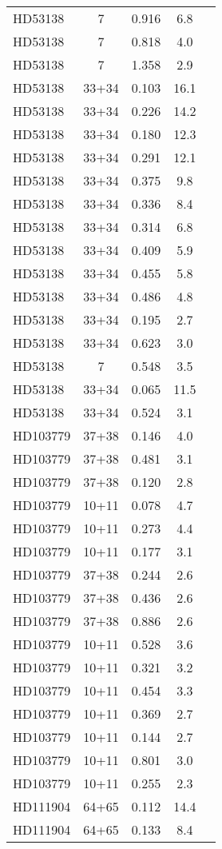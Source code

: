 \begin{table*}
\begin{tabular}{l c c c c}
HD53138 & 7 & 0.916 & 6.8\\ 
HD53138 & 7 & 0.818 & 4.0\\ 
HD53138 & 7 & 1.358 & 2.9\\ 
HD53138 & 33+34 & 0.103 & 16.1\\ 
HD53138 & 33+34 & 0.226 & 14.2\\ 
HD53138 & 33+34 & 0.180 & 12.3\\ 
HD53138 & 33+34 & 0.291 & 12.1\\ 
HD53138 & 33+34 & 0.375 & 9.8\\ 
HD53138 & 33+34 & 0.336 & 8.4\\ 
HD53138 & 33+34 & 0.314 & 6.8\\ 
HD53138 & 33+34 & 0.409 & 5.9\\ 
HD53138 & 33+34 & 0.455 & 5.8\\ 
HD53138 & 33+34 & 0.486 & 4.8\\ 
HD53138 & 33+34 & 0.195 & 2.7\\ 
HD53138 & 33+34 & 0.623 & 3.0\\ 
HD53138 & 7 & 0.548 & 3.5\\ 
HD53138 & 33+34 & 0.065 & 11.5\\ 
HD53138 & 33+34 & 0.524 & 3.1\\ 
\hline
HD103779 & 37+38 & 0.146 & 4.0\\ 
HD103779 & 37+38 & 0.481 & 3.1\\ 
HD103779 & 37+38 & 0.120 & 2.8\\ 
HD103779 & 10+11 & 0.078 & 4.7\\ 
HD103779 & 10+11 & 0.273 & 4.4\\ 
HD103779 & 10+11 & 0.177 & 3.1\\ 
HD103779 & 37+38 & 0.244 & 2.6\\ 
HD103779 & 37+38 & 0.436 & 2.6\\ 
HD103779 & 37+38 & 0.886 & 2.6\\ 
HD103779 & 10+11 & 0.528 & 3.6\\ 
HD103779 & 10+11 & 0.321 & 3.2\\ 
HD103779 & 10+11 & 0.454 & 3.3\\ 
HD103779 & 10+11 & 0.369 & 2.7\\ 
HD103779 & 10+11 & 0.144 & 2.7\\ 
HD103779 & 10+11 & 0.801 & 3.0\\ 
HD103779 & 10+11 & 0.255 & 2.3\\ 
\hline
HD111904 & 64+65 & 0.112 & 14.4\\ 
HD111904 & 64+65 & 0.133 & 8.4\\ 

\end{tabular}
\end{table*}
